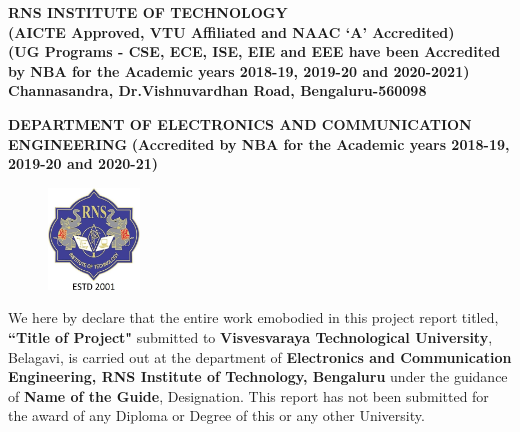 
\setlength{\toptafiddle}{1in}
\setlength{\bottafiddle}{1in}
\vspace*{-0.5in}
\enlargethispage{\bottafiddle}
\thispagestyle{empty}


\begin{center}
	\large\textbf{RNS INSTITUTE OF TECHNOLOGY}\\
	\small\textbf{(AICTE Approved, VTU Affiliated and NAAC `A' Accredited)\\
		(UG Programs - CSE, ECE, ISE, EIE and EEE have been Accredited by NBA for the Academic years 2018-19, 2019-20 and 2020-2021)\\
		Channasandra, Dr.Vishnuvardhan Road, Bengaluru-560098}\\
		\vspace{0.1cm}
\end{center}
\begin{center}
		\footnotesize\textbf{DEPARTMENT OF ELECTRONICS AND COMMUNICATION ENGINEERING}
		\small\textbf{(Accredited by NBA for the Academic years 2018-19, 2019-20 and 2020-21)}	
\end{center}

\begin{center}
\begin{figure}[h]
\centering
\includegraphics[height=2.7cm]{images/rns1.jpg}
\end{figure}
\Large{\textbf{\color{red}{DECLARATION}}}
\end{center}

We here by declare that the entire work emobodied in this project report titled, \textbf{\color{red}``Title of Project"} submitted to \textbf{\color{red}Visvesvaraya Technological University}, Belagavi, is carried out at the department of             \textbf{\color{blue}Electronics and Communication Engineering, RNS Institute of Technology, Bengaluru} under the guidance of \textbf{\color{blue}Name of the Guide}, Designation. This report has not been submitted for the award of any Diploma or Degree of this or any other University.


